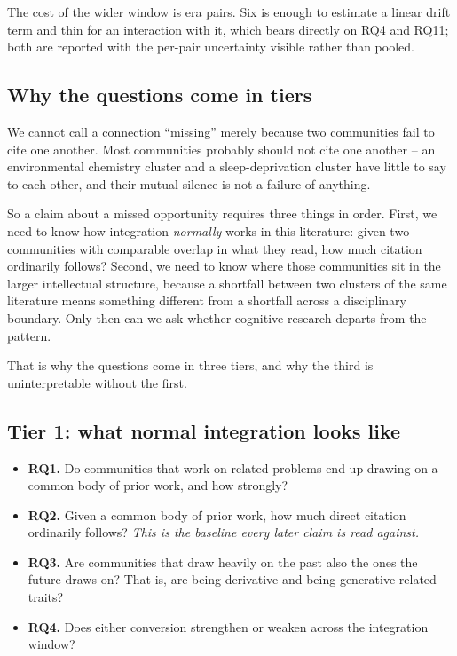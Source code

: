 \documentclass[11pt]{article}
\begin{document}
The cost of the wider window is era pairs. Six is enough to estimate a linear drift term
and thin for an interaction with it, which bears directly on RQ4 and RQ11; both are
reported with the per-pair uncertainty visible rather than pooled.

\subsection{Why the questions come in tiers}

We cannot call a connection ``missing'' merely because two communities fail to cite one
another. Most communities probably should not cite one another -- an environmental
chemistry cluster and a sleep-deprivation cluster have little to say to each other, and
their mutual silence is not a failure of anything.

So a claim about a missed opportunity requires three things in order. First, we need to
know how integration \emph{normally} works in this literature: given two communities with
comparable overlap in what they read, how much citation ordinarily follows? Second, we
need to know where those communities sit in the larger intellectual structure, because a
shortfall between two clusters of the same literature means something different from a
shortfall across a disciplinary boundary. Only then can we ask whether cognitive research
departs from the pattern.

That is why the questions come in three tiers, and why the third is uninterpretable
without the first.

\subsection{Tier 1: what normal integration looks like}

\begin{itemize}[leftmargin=2em]
  \item \textbf{RQ1.} Do communities that work on related problems end up drawing on a
        common body of prior work, and how strongly?
  \item \textbf{RQ2.} Given a common body of prior work, how much direct citation
        ordinarily follows? \emph{This is the baseline every later claim is read
        against.}
  \item \textbf{RQ3.} Are communities that draw heavily on the past also the ones the
        future draws on? That is, are being derivative and being generative related
        traits?
  \item \textbf{RQ4.} Does either conversion strengthen or weaken across the integration
        window?
\end{itemize}
\end{document}
